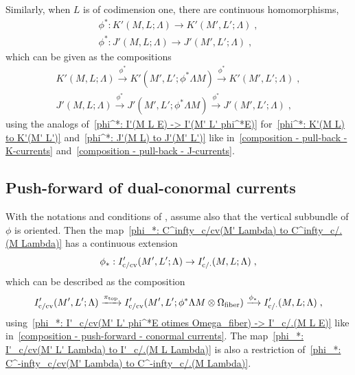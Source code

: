 \documentclass{memo-l}
\theoremstyle{plain}
\theoremstyle{definition}
\theoremstyle{remark}
\newcommand{\fiber}{{\text{\rm fiber}}}
\newcommand{\topd}{{\text{\rm top}}}
\newcommand{\co}{{\text{\rm c}}}
\newcommand{\cv}{{\text{\rm cv}}}
\numberwithin{section}{chapter}
\numberwithin{equation}{section}%
\begin{document}
Similarly, when $L$ is of codimension one, there are continuous homomorphisms,
\begin{gather}
\phi^*:K'(M,L;\Lambda)\to K'(M',L';\Lambda)\;,\label{phi^*: K'(M L Lambda) to K'(M' L' Lambda)}\\
\phi^*:J'(M,L;\Lambda)\to J'(M',L';\Lambda)\;,\label{phi^*: J'(M L Lambda) to J'(M' L' Lambda)}
\end{gather}
which can be given as the compositions
\begin{gather*}
K'(M,L;\Lambda)\xrightarrow{\phi^*}K'(M',L';\phi^*\Lambda M)\xrightarrow{\phi^*}K'(M',L';\Lambda)\;,\\
J'(M,L;\Lambda)\xrightarrow{\phi^*}J'(M',L';\phi^*\Lambda M)\xrightarrow{\phi^*}J'(M',L';\Lambda)\;,
\end{gather*}
using the analogs of~\eqref{phi^*: I'(M L E) -> I'(M' L' phi^*E)} for~\eqref{phi^*: K'(M L) to K'(M' L')} and~\eqref{phi^*: J'(M L) to J'(M' L')} like in~\eqref{composition - pull-back - K-currents} and~\eqref{composition - pull-back - J-currents}.



\subsection{Push-forward of dual-conormal currents}\label{ss: push-forward of dual-conormal currents}

With the notations and conditions of , assume also that the vertical subbundle of $\phi$ is oriented. Then the map~\eqref{phi_*: C^infty_c/cv(M' Lambda) to C^infty_c/.(M Lambda)} has a continuous extension
\begin{equation}\label{phi_*: I'_c/cv(M' L' Lambda) to I'_c/.(M L Lambda)}
\phi_*:I'_{\co/\cv}(M',L';\Lambda)\to I'_{\co/{\cdot}}(M,L;\Lambda)\;,
\end{equation}
which can be described as the composition
\[
I'_{\co/\cv}(M',L';\Lambda)\xrightarrow{\pi_\topd}I'_{\co/\cv}(M',L';\phi^*\Lambda M\otimes\Omega_\fiber)
\xrightarrow{\phi_*}I'_{\co/{\cdot}}(M,L;\Lambda)\;,
\]
using~\eqref{phi_*: I'_c/cv(M' L' phi^*E otimes Omega_fiber) -> I'_c/.(M L E)} like in~\eqref{composition - push-forward - conormal currents}. The map~\eqref{phi_*: I'_c/cv(M' L' Lambda) to I'_c/.(M L Lambda)} is also a restriction of~\eqref{phi_*: C^-infty_c/cv(M' Lambda) to C^-infty_c/.(M Lambda)}.
\end{document}

